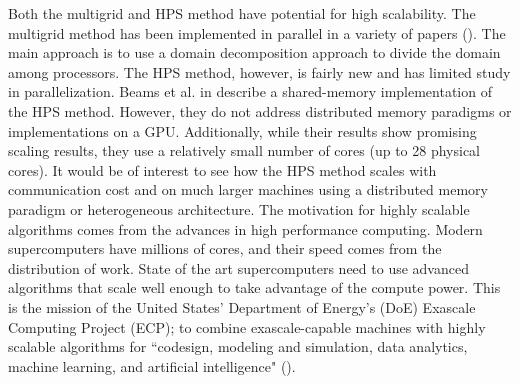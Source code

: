 Both the multigrid and HPS method have potential for high scalability. The multigrid method has been implemented in parallel in a variety of papers (\citep{bergen2006massively}). The main approach is to use a domain decomposition approach to divide the domain among processors. The HPS method, however, is fairly new and has limited study in parallelization. Beams et al. in \citep{beams2020parallel} describe a shared-memory implementation of the HPS method. However, they do not address distributed memory paradigms or implementations on a GPU. Additionally, while their results show promising scaling results, they use a relatively small number of cores (up to 28 physical cores). It would be of interest to see how the HPS method scales with communication cost and on much larger machines using a distributed memory paradigm or heterogeneous architecture. The motivation for highly scalable algorithms comes from the advances in high performance computing. Modern supercomputers have millions of cores, and their speed comes from the distribution of work. State of the art supercomputers need to use advanced algorithms that scale well enough to take advantage of the compute power. This is the mission of the United States' Department of Energy's (DoE) Exascale Computing Project (ECP); to combine exascale-capable machines with highly scalable algorithms for ``codesign, modeling and simulation, data analytics, machine learning, and artificial intelligence" (\citep{doe2021exascale}).
